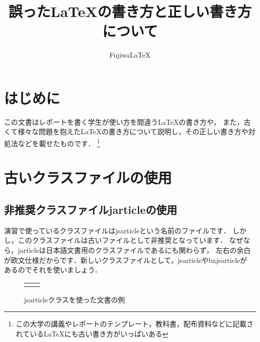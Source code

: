\documentclass[dvipdfmx,uplatex]{jsarticle}
\title{誤った\LaTeX の書き方と正しい書き方について}
\author{Fujiwa\LaTeX}
\begin{document}
\maketitle
\tableofcontents
\section{はじめに}
この文書はレポートを書く学生が使い方を間違う\LaTeX の書き方や，
また，古くて様々な問題を抱えた\LaTeX の書き方について説明し，その正しい書き方や対処法などを載せたものです．%
\footnote{この大学の講義やレポートのテンプレート，教科書，配布資料などに記載されている\LaTeX にも古い書き方がいっぱいある}%
\section{古いクラスファイルの使用}
\subsection{非推奨クラスファイルjarticleの使用}
演習で使っているクラスファイルはjsarticleという名前のファイルです．
しかし，このクラスファイルは古いファイルとして非推奨となっています．
なぜなら，jarticleは日本語文書用のクラスファイルであるにも関わらず，
左右の余白が欧文仕様だからです．新しいクラスファイルとして，jsarticleやbxjsarticleが
あるのでそれを使いましょう．
\begin{tcolorbox}[title=古いクラスファイルと新しいクラスファイル]
  \begin{tcolorbox}[title=jarticle, colframe=wrongcolor]
  \end{tcolorbox}
  \begin{tcolorbox}[title=jsarticle, colframe=correctcolor]
  \end{tcolorbox}
\end{tcolorbox}
\begin{figure}[H]
  \begin{tabular}{cc}
    \begin{minipage}{0.45\columnwidth}
      \centering
      \caption{jarticleクラスを使った文書の例}
    \end{minipage}
    \begin{minipage}{0.45\columnwidth}
      \centering
      \caption{jsarticleクラスを使った文書の例}
    \end{minipage}
  \end{tabular}
\end{figure}
\end{document}
